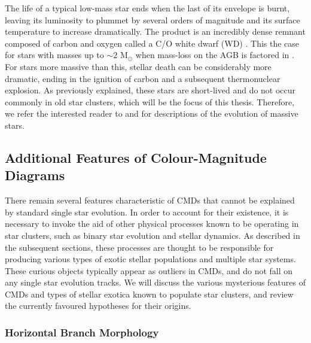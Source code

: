 The life of a typical low-mass star ends when the last of its
envelope is burnt, leaving its luminosity to plummet by several
orders of magnitude and its surface temperature to increase
dramatically.  The product is an incredibly dense remnant composed
of carbon and oxygen called a C/O white dwarf (WD) \citep{iben74}.  
This the case for stars with masses up to $\sim 2$ M$_{\odot}$ when
mass-loss on the AGB is factored in \citep{eggleton06}.  For stars
more massive than 
this, stellar death can be considerably more dramatic, ending in the
ignition of carbon and a subsequent thermonuclear explosion.  As
previously explained, these stars are short-lived and do not occur
commonly in old star clusters, which will be the focus of this
thesis.  Therefore, we refer the interested reader to
\citet{clayton68} and \citet{maeder09} for descriptions of the
evolution of massive stars.

\subsection{Additional Features of Colour-Magnitude Diagrams} \label{extra}

There remain several features characteristic of CMDs that cannot be
explained by standard single star evolution.  In order to
account for their existence, it is 
necessary to invoke the aid of other physical processes known to be
operating in star clusters, such as 
binary star evolution and stellar dynamics.  As described in the
subsequent sections, these processes are thought to be responsible for
producing various types of exotic stellar populations and multiple
star systems.  These curious objects typically appear as outliers in
CMDs, and do not fall on any single star evolution tracks.  
We will discuss the various mysterious features of CMDs and types of
stellar exotica known to populate star
clusters, and review the currently favoured hypotheses for their
origins.

\subsubsection{Horizontal Branch Morphology} \label{HBs_intro}

